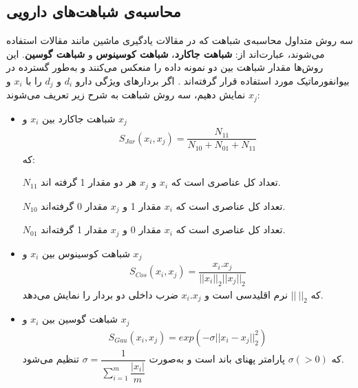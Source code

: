 \subsection{محاسبه‌ی شباهت‌های دارویی
\label{simCal}}

سه روش متداول محاسبه‌ی شباهت که در مقالات یادگیری ماشین مانند مقالات
\cite{FWang2008,WZhang2016, WZhang2017}
 استفاده می‌شوند، عبارت‌اند از:
\textbf{شباهت جاکارد}،
\textbf{شباهت کوسینوس}
و
\textbf{شباهت گوسین}. 
این روش‌ها مقدار شباهت بین دو نمونه داده را منعکس می‌کنند و به‌طور گسترده در بیوانفورماتیک مورد استفاده قرار گرفته‌‌اند
\cite{WZhang2017, WZhang20171, WZhang20172, WZhang2018_1, WZhang2018_2}.
اگر بردارهای ویژگی دارو
$d_i$
و
$d_j$
را با
$x_i$
و
$x_j$
نمایش دهیم، سه روش شباهت به شرح زیر تعریف می‌شوند:


\begin{itemize}
\item شباهت جاکارد بین
$x_i$ 
و
$x_j$ 
\begin{equation}
\begin{aligned}
S_{Jar}(x_i,x_j) =\dfrac{N_{11}}{N_{10} + N_{01} + N_{11}}
\end{aligned}
\end{equation}
که:

$N_{11}$ 
تعداد کل عناصری است که
$x_i$
و
$x_j$
هر دو مقدار 1 گرفته اند. 
 
$N_{10}$ 
تعداد کل عناصری است که
$x_i$ 
مقدار 1 و
$x_j$
مقدار 0 گرفته‌اند. 
  
$N_{01}$ 
تعداد کل عناصری است که
$x_i$
مقدار 0 و 
$x_j$ 
مقدار 1 گرفته‌اند. 

\item شباهت کوسینوس بین
$x_i$
و 
$x_j$
\begin{equation}
\begin{aligned}
S_{Cos}(x_i,x_j) =\dfrac{x_i . x_j}{||x_i||_2 ||x_j||_2}
\end{aligned}
\end{equation}
که
$||~||_2$
نرم اقلیدسی است و
${x_i . x_j}$
ضرب داخلی دو بردار را نمایش می‌دهد.


\item شباهت گوسین بین
$x_i$
و 
$x_j$
\begin{equation}
\begin{aligned}
S_{Gau}(x_i,x_j) = exp(-\sigma ||x_i - x_j||_2^2)
\end{aligned}
\end{equation}
که
$\sigma  (>0)$
پارامتر پهنای باند است و به‌صورت
$\sigma  =\dfrac{1}{\sum _{i=1}^m \dfrac{|x_i|}{m}}$
تنظیم می‌شود.
\end{itemize}

